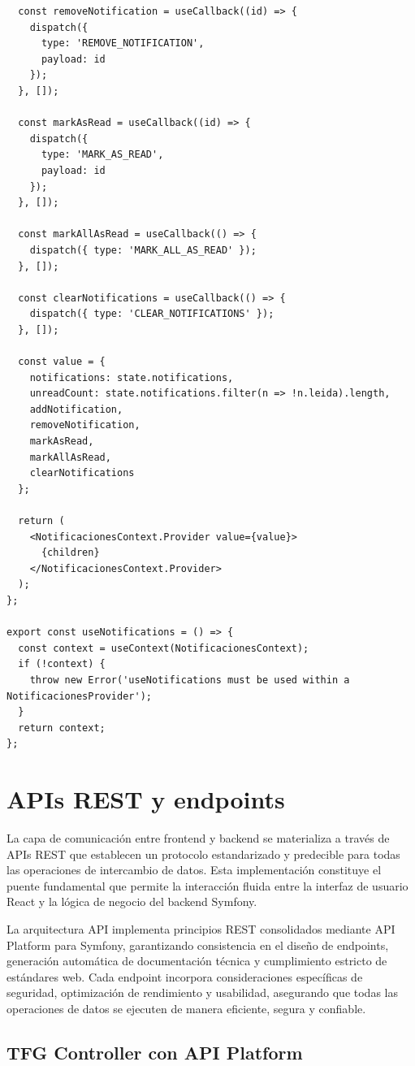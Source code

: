 \documentclass[12pt,a4paper,oneside]{report}
\begin{document}
\begin{lstlisting}
  const removeNotification = useCallback((id) => {
    dispatch({
      type: 'REMOVE_NOTIFICATION',
      payload: id
    });
  }, []);

  const markAsRead = useCallback((id) => {
    dispatch({
      type: 'MARK_AS_READ',
      payload: id
    });
  }, []);

  const markAllAsRead = useCallback(() => {
    dispatch({ type: 'MARK_ALL_AS_READ' });
  }, []);

  const clearNotifications = useCallback(() => {
    dispatch({ type: 'CLEAR_NOTIFICATIONS' });
  }, []);

  const value = {
    notifications: state.notifications,
    unreadCount: state.notifications.filter(n => !n.leida).length,
    addNotification,
    removeNotification,
    markAsRead,
    markAllAsRead,
    clearNotifications
  };

  return (
    <NotificacionesContext.Provider value={value}>
      {children}
    </NotificacionesContext.Provider>
  );
};

export const useNotifications = () => {
  const context = useContext(NotificacionesContext);
  if (!context) {
    throw new Error('useNotifications must be used within a NotificacionesProvider');
  }
  return context;
};
\end{lstlisting}

\section{APIs REST y endpoints}\label{apis-rest-y-endpoints}

La capa de comunicación entre frontend y backend se materializa a través de APIs REST que establecen un protocolo estandarizado y predecible para todas las operaciones de intercambio de datos. Esta implementación constituye el puente fundamental que permite la interacción fluida entre la interfaz de usuario React y la lógica de negocio del backend Symfony.

La arquitectura API implementa principios REST consolidados mediante API Platform para Symfony, garantizando consistencia en el diseño de endpoints, generación automática de documentación técnica y cumplimiento estricto de estándares web. Cada endpoint incorpora consideraciones específicas de seguridad, optimización de rendimiento y usabilidad, asegurando que todas las operaciones de datos se ejecuten de manera eficiente, segura y confiable.

\subsection{TFG Controller con API
Platform}\label{tfg-controller-con-api-platform}
\end{document}
